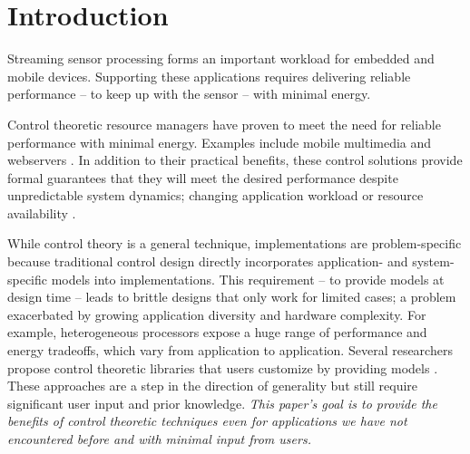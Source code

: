 \section{Introduction}

Streaming sensor processing forms an important workload for embedded
and mobile devices. Supporting these applications requires delivering
reliable performance -- to keep up with the sensor -- with minimal
energy.

Control theoretic resource managers have proven to meet the need for
reliable performance with minimal energy.  Examples include mobile
multimedia \cite{grace,grace2,Agilos,flinn2004,xtune,} and webservers
\cite{Horvarth,Verma,LuEtAl-2006a,sha2002queuefeedback}.  In addition
to their practical benefits, these control solutions provide formal
guarantees that they will meet the desired performance despite
unpredictable system dynamics; \eg{} changing application workload or
resource availability
\cite{ICSE2014,Hellerstein2004a,KaramanolisEtAl-2005a}.

While control theory is a general technique, implementations are
problem-specific because traditional control design directly
incorporates application- and system-specific models into
implementations.  This requirement -- to provide models at design time
-- leads to brittle designs that only work for limited cases; a
problem exacerbated by growing application diversity and hardware
complexity.  For example, heterogeneous processors expose a huge range
of performance and energy tradeoffs, which vary from application to
application.  Several researchers propose control theoretic libraries
that users customize by providing models
\cite{POET,ControlWare,SWiFT}.  These approaches are a step in the
direction of generality but still require significant user input and
prior knowledge.  \emph{This paper's goal is to provide the benefits
  of control theoretic techniques even for applications we have not
  encountered before and with minimal input from users.}

